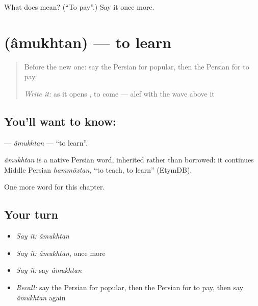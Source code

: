 \begin{tcolorbox}[breakable,colback=teal!4,colframe=teal!35!black,title={Before you move on}]
What does  mean? (\textquotedblleft{}To pay\textquotedblright{}.) Say it once more.
\end{tcolorbox}
\section[\texorpdfstring{\fa{آموختن} (âmukhtan)}{آموختن (âmukhtan)}]{ (âmukhtan) — to learn}

\label{lesson:FA-C131-amukhtan}



\begin{quote}
Before the new one: say the Persian for popular, then the Persian for to pay.

\emph{Write it:} \textbf{} as it opens \textbf{}, to come — alef with the wave above it
\end{quote}

\subsection*{You'll want to know: }
\textbf{} — \emph{âmukhtan} — \textquotedblleft{}to learn\textquotedblright{}.

\begin{cousinweb}
\emph{âmukhtan} is a native Persian word, inherited rather than borrowed: it continues Middle Persian \emph{hammōxtan}, \textquotedblleft{}to teach, to learn\textquotedblright{} (EtymDB).
\end{cousinweb}

\begin{grammarlens}[title={What you've built}]
One more word for this chapter.
\end{grammarlens}

\subsection*{Your turn}
\begin{itemize}
\raggedright
  \item \emph{Say it:} \emph{âmukhtan}
  \item \emph{Say it:} \emph{âmukhtan}, once more
  \item \emph{Say it:} say \emph{âmukhtan}
  \item \emph{Recall:} say the Persian for popular, then the Persian for to pay, then say \emph{âmukhtan} again
\end{itemize}

